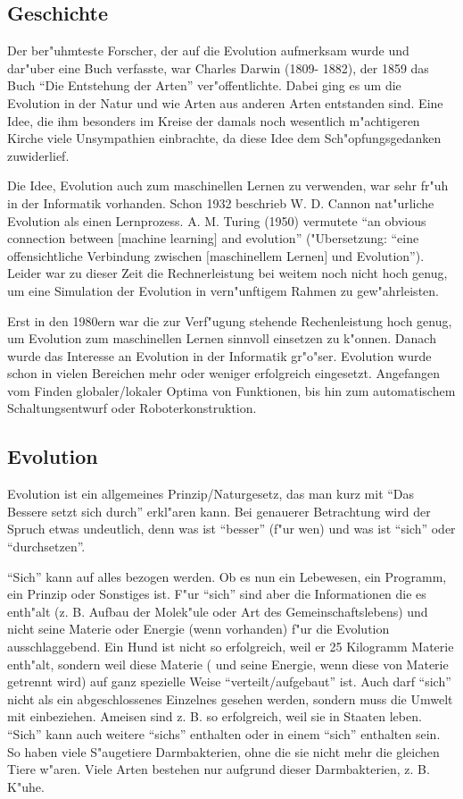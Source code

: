 \subsection{Geschichte}

Der ber"uhmteste Forscher, der auf die Evolution aufmerksam wurde und dar"uber eine Buch verfasste, war Charles Darwin (1809- 1882), der 1859 das Buch ``Die Entstehung der Arten''\cite{EACD} ver"offentlichte. Dabei ging es um die Evolution in der Natur und wie Arten aus anderen Arten entstanden sind. Eine Idee, die ihm besonders im Kreise der damals noch wesentlich m"achtigeren Kirche viele Unsympathien einbrachte, da diese Idee dem Sch"opfungsgedanken zuwiderlief.

Die Idee, Evolution auch zum maschinellen Lernen zu verwenden, war sehr fr"uh in der Informatik vorhanden. Schon 1932 beschrieb W. D. Cannon nat"urliche Evolution als einen Lernprozess. A. M. Turing (1950) vermutete ``an obvious connection between $[$machine learning$]$ and evolution'' ("Ubersetzung: ``eine offensichtliche Verbindung zwischen $[$maschinellem Lernen$]$ und Evolution''). Leider war zu dieser Zeit die Rechnerleistung bei weitem noch nicht hoch genug, um eine Simulation der Evolution in vern"unftigem Rahmen zu gew"ahrleisten.

Erst in den 1980ern war die zur Verf"ugung stehende Rechenleistung hoch genug, um Evolution zum maschinellen Lernen sinnvoll einsetzen zu k"onnen. Danach wurde das Interesse an Evolution in der Informatik gr"o"ser. Evolution wurde schon in vielen Bereichen mehr oder weniger erfolgreich eingesetzt. Angefangen vom Finden globaler/lokaler Optima von Funktionen, bis hin zum automatischem Schaltungsentwurf oder Roboterkonstruktion.


\subsection{Evolution}

Evolution ist ein allgemeines Prinzip/Naturgesetz, das man kurz mit ``Das Bessere setzt sich durch'' erkl"aren kann. Bei genauerer Betrachtung wird der Spruch etwas undeutlich, denn was ist ``besser'' (f"ur wen) und was ist ``sich'' oder ``durchsetzen''.

``Sich'' kann auf alles bezogen werden. Ob es nun ein Lebewesen, ein Programm, ein Prinzip oder Sonstiges ist. F"ur ``sich'' sind aber die Informationen die es enth"alt (z. B. Aufbau der Molek"ule oder Art des Gemeinschaftslebens) und nicht seine Materie oder Energie (wenn vorhanden) f"ur die Evolution ausschlaggebend. Ein Hund ist nicht so erfolgreich, weil er 25 Kilogramm Materie enth"alt, sondern weil diese Materie ( und seine Energie, wenn diese von Materie getrennt wird) auf ganz spezielle Weise ``verteilt/aufgebaut'' ist. Auch darf ``sich'' nicht als ein abgeschlossenes Einzelnes gesehen werden, sondern muss die Umwelt mit einbeziehen. Ameisen sind z. B. so erfolgreich, weil sie in Staaten leben. ``Sich'' kann auch weitere ``sichs'' enthalten oder in einem ``sich'' enthalten sein. So haben viele S"augetiere Darmbakterien, ohne die sie nicht mehr die gleichen Tiere w"aren. Viele Arten bestehen nur aufgrund dieser Darmbakterien, z. B. K"uhe.

